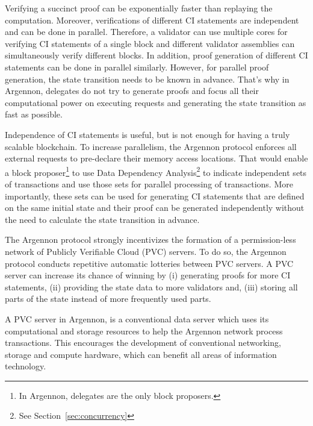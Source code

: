 Verifying a succinct proof can be exponentially faster than replaying the computation. Moreover, verifications of
different CI statements are independent and can be done in parallel. Therefore, a validator can use multiple cores for
verifying CI statements of a single block and different validator assemblies can simultaneously verify different blocks.
In addition, proof generation of different CI statements can be done in parallel similarly. However, for parallel
proof generation, the state transition needs to be known in advance. That's why in Argennon, delegates do not try
to generate proofs and focus all their computational power on executing requests and generating the state transition
as fast as possible.

Independence of CI statements is useful, but is not enough for having a truly scalable blockchain. To increase
parallelism, the Argennon protocol enforces all external requests to pre-declare their memory access locations. That
would enable a block proposer\footnote{In Argennon, delegates are the only block proposers.} to use Data Dependency
Analysis\footnote{See Section~\ref{sec:concurrency}} to indicate independent sets of transactions and use those sets
for parallel processing of transactions. More importantly, these sets can be used for generating CI statements that
are defined on the same initial state and their proof can be generated independently without the need to calculate
the state transition in advance.

The Argennon protocol strongly incentivizes the formation of a permission-less network of Publicly Verifiable
Cloud (PVC) servers. To do so, the Argennon protocol conducts repetitive automatic lotteries between PVC servers.
A PVC server can increase its chance of winning by (i) generating proofs for more CI statements, (ii) providing the
state data to more validators and, (iii) storing all parts of the state instead of more frequently used parts.

A PVC server in Argennon, is a conventional data server which uses its computational and
storage resources to help the Argennon network process transactions. This encourages the development
of conventional networking, storage and compute hardware, which can benefit all areas of information technology.
